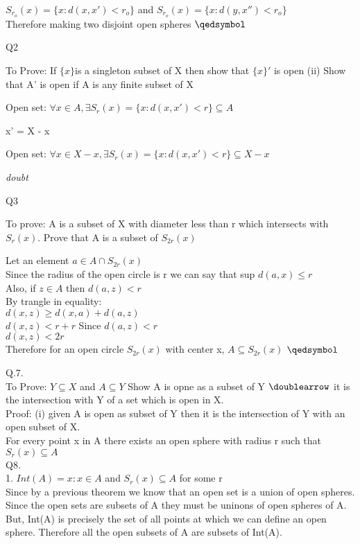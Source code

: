 \documentclass{article}
\begin{document}
$S_{r_o}(x) = \{x: d(x,x') < r_o\}$ and $S_{r_o}(x) = \{x: d(y,x'') < r_o\}$\\

Therefore making two disjoint open spheres  $\qedsymbol$

\proof Q2

To Prove: If $ \{x\} $is a singleton subset of X then show that $ \{x\}' $ is open
(ii) Show that A' is open if A is any finite subset of X

Open set: $\forall x \in A ,\exists S_r(x) = \{x: d(x,x') < r\}\subseteq A$

{x}' = X - {x}


Open set: $\forall x \in X - {x} ,\exists S_r(x) = \{x: d(x,x') < r\}\subseteq X - {x}$

\emph{doubt}

\proof Q3

To prove: A is a subset of X with diameter less than r which intersects with $ S_r(x)$. Prove that A is a subset of $ S_{2r}(x) $  

Let an element $a \in A \cap  S_{2r}(x) $ \\
Since the radius of the open circle is r we can say that sup $d(a,x) \leq r$\\ 

Also, if $z \in A$  then $d(a,z) < r$\\
By trangle in equality:\\
$d(x,z) \geq d(x,a) + d(a,z)$\\
$d(x,z) < r + r$ Since $d(a,z) < r$ \\ 
$d(x,z) < 2r$\\

Therefore for an open circle $ S_{2r}(x)$ with center x, $A \subseteq  S_{2r}(x) $ 
$\qedsymbol$



\proof Q.7.\\
To Prove: $Y \subseteq X$ and $A \subseteq Y$ 
Show A is opne as a subset of Y $\doublearrow$ it is the intersection with Y of a set which is open in X.\\
Proof: (i) given A is open as subset of Y then it is the intersection of Y with an open subset of X.\\

For every point x in A there exists an open sphere with radius r such that $ S_r(x) \subseteq A $\\


\proof Q8. \\
1. $Int(A)=x: x\in A$ and  $S_r(x) \subseteq A$ for some r\\ 
Since by a previous theorem we know that an open set is a union of open spheres.
Since the open sets are subsets of A they must be uninons of open spheres of A.\\
But, Int(A) is precisely the set of all points at which we can define an open 
sphere. Therefore all the open subsets of A are subsets of Int(A).
\end{document}
